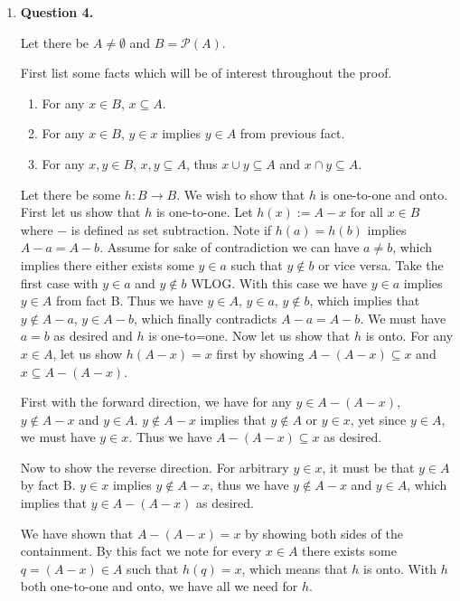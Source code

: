 \documentclass{article}
\begin{document}
			 \begin{enumerate}
			 	\item \textbf{Question 4.}
				\medskip
								
				Let there be $A \neq \emptyset$ and $B = \mathcal{P}(A)$. 
				
				
				First list some facts which will be of interest throughout the proof. 
				\begin{enumerate}
					\item For any $x \in B$, $x \subseteq A$.
					\item For any $x \in B$, $y \in x$ implies $y \in A$ from previous fact.
					\item For any $x,y \in B$, $x,y \subseteq A$, thus $x \cup y \subseteq A$ and $x \cap y \subseteq A$.
				\end{enumerate}
				
				Let there be some $h: B \xrightarrow{} B$. We wish to show that $h$ is one-to-one and onto. First let us show that $h$ is one-to-one. Let $h(x) := A - x$ for all $x \in B$ where $-$ is defined as set subtraction. Note if $h(a) = h(b)$ implies $A - a = A - b$. Assume for sake of contradiction we can have $a \neq b$, which implies there either exists some $y \in a$ such that $y \notin b$ or vice versa. Take the first case with $y \in a$ and $y \notin b$ WLOG. With this case we have $y \in a$ implies $y \in A$ from fact B. Thus we have $y \in A$, $y \in a$, $y \notin b$, which implies that $y \notin A - a$, $y \in A - b$, which finally contradicts $A - a = A - b$. We must have $a = b$ as desired and $h$ is one-to=one. Now let us show that $h$ is onto. For any $x \in A$, let us show $h(A - x) = x$ first by showing $A - (A - x) \subseteq x$ and $x \subseteq A - (A - x)$.
				
				\medskip
				First with the forward direction, we have for any $y \in A - (A - x)$, $y \notin A - x$ and $y \in A$. $y \notin A - x$ implies that $y \notin A$ or $y \in x$, yet since $y \in A$, we must have $y \in x$. Thus we have $A - (A - x) \subseteq x$ as desired.
				
				\medskip
				Now to show the reverse direction. For arbitrary $y \in x$, it must be that $y \in A$ by fact B. $y \in x$ implies $y \notin A - x$, thus we have $y \notin A - x$ and $y \in A$, which implies that $y \in A - (A - x)$ as desired. 
				
				\medskip
				We have shown that $A - (A - x) = x$ by showing both sides of the containment. By this fact we note for every $x \in A$ there exists some $q  = (A - x) \in A$ such that $h(q) = x$, which means that $h$ is onto. With $h$ both one-to-one and onto, we have all we need for $h$. 
				

\end{enumerate}
\end{document}
